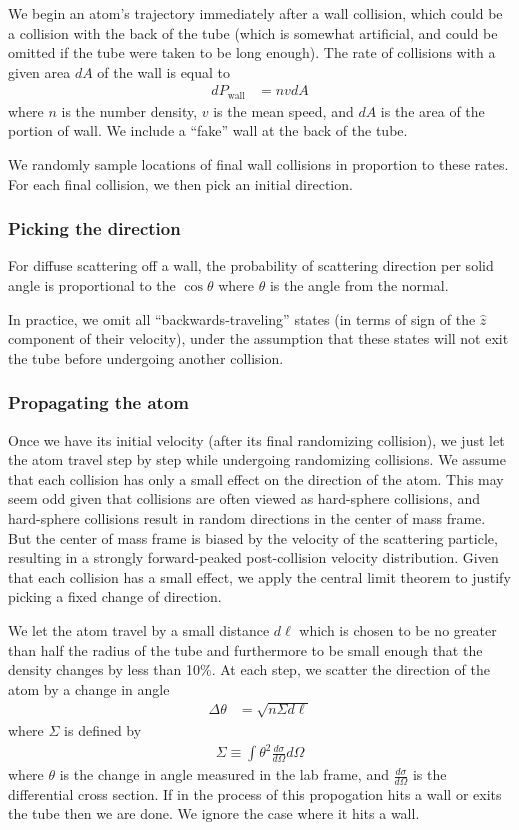 \documentclass{article}
\begin{document}
We begin an atom's trajectory immediately after a wall collision, which could be a collision with the back of
the tube (which is somewhat artificial, and could be omitted if the
tube were taken to be long enough).  The rate of collisions with a given area $dA$ of the
wall is equal to
\begin{align}
  dP_{\text{wall}} &= nvdA
\end{align}
where $n$ is the number density, $v$ is the mean speed, and $dA$ is
the area of the portion of wall.  We include a ``fake'' wall at the
back of the tube.

We randomly sample locations of final wall collisions in proportion to these rates.  For
each final collision, we then pick an initial direction.

\subsubsection{Picking the direction}
For diffuse scattering off a wall, the probability
of scattering direction per solid angle is proportional to the
$\cos\theta$ where $\theta$ is the angle from the normal.

In practice, we omit all ``backwards-traveling'' states (in terms of sign of the $\hat z$ component of their velocity),
under the assumption that these states will not exit the tube before
undergoing another collision.

\subsubsection{Propagating the atom}
Once we have its initial velocity (after its final randomizing
collision), we just let the atom travel step by step while undergoing
randomizing collisions.  We assume that each collision has only a small effect on the direction of the atom.  This may seem odd given that collisions are often viewed as hard-sphere collisions, and hard-sphere collisions result in random directions in the center of mass frame.  But the center of mass frame is biased by the velocity of the scattering particle, resulting in a strongly forward-peaked post-collision velocity distribution.  Given that each collision has a small effect, we apply the central limit theorem to justify picking a fixed change of direction.

We let the atom travel by a small distance $d\ell$
which is chosen to be no greater than half the radius of the tube and
furthermore to be small enough that the density changes by less than
10\%.  At each step, we scatter the direction of the atom by a change
in angle
\begin{align}
  \Delta\theta &= \sqrt{n\Sigma d\ell}
\end{align}
where $\Sigma$ is defined by
\begin{align}
    \Sigma \equiv \int \theta^2 \frac{d\sigma}{d\Omega} d\Omega
\end{align}
where $\theta$ is the change in angle measured in the lab frame, and $\frac{d\sigma}{d\Omega}$ is the differential cross section.  If in the process of this propogation hits a wall or
exits the tube then we are done.  We ignore the case where it hits a
wall.
\end{document}
